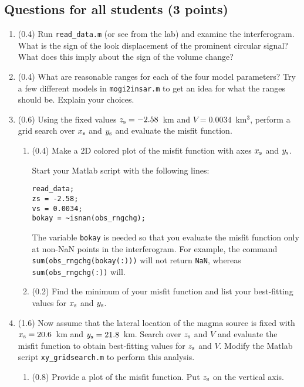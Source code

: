 \documentclass[11pt,titlepage,fleqn]{article}
\begin{document}

\subsection*{Questions for all students (3 points)}

\begin{enumerate}
\item (0.4) Run \verb+read_data.m+ (or see  from the lab) and examine the interferogram. What is the sign of the look displacement of the prominent circular signal? What does this imply about the sign of the volume change?

\item (0.4) What are reasonable ranges for each of the four model parameters? Try a few different models in \verb+mogi2insar.m+ to get an idea for what the ranges should be. Explain your choices.

\item (0.6) Using the fixed values $z_{\rm s} = -2.58$~km and $V = 0.0034$~km$^3$, perform a grid search over $x_{\rm s}$ and $y_{\rm s}$ and evaluate the misfit function.
%
\begin{enumerate}
\item (0.4) Make a 2D colored plot of the misfit function with axes $x_{\rm s}$ and $y_{\rm s}$.

Start your Matlab script with the following lines:
%
\begin{verbatim}
read_data;
zs = -2.58;
vs = 0.0034;
bokay = ~isnan(obs_rngchg);
\end{verbatim}
%
The variable \verb+bokay+ is needed so that you evaluate the misfit function only at non-NaN points in the interferogram. For example, the command \verb+sum(obs_rngchg(bokay(:)))+ will not return \verb+NaN+, whereas \verb+sum(obs_rngchg(:))+ will.

\item (0.2) Find the minimum of your misfit function and list your best-fitting values for $x_{\rm s}$ and $y_{\rm s}$.

\end{enumerate}

\item (1.6) Now assume that the lateral location of the magma source is fixed with $x_{\rm s} = 20.6$~km and $y_{\rm s} = 21.8$~km. Search over $z_{\rm s}$ and $V$ and evaluate the misfit function to obtain best-fitting values for $z_{\rm s}$ and $V$. Modify the Matlab script \verb+xy_gridsearch.m+ to perform this analysis.
%
\begin{enumerate}
\item (0.8) Provide a plot of the misfit function. Put $z_{\rm s}$ on the vertical axis.


\end{enumerate}
\end{enumerate}
\end{document}
